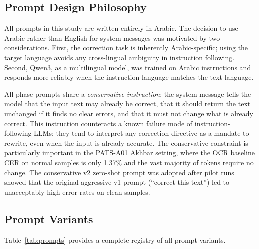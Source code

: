 \subsection{Prompt Design Philosophy}
\label{subsec:prompt_design}

All prompts in this study are written entirely in Arabic.
The decision to use Arabic rather than English for system messages was motivated
by two considerations.
First, the correction task is inherently Arabic-specific; using the target language
avoids any cross-lingual ambiguity in instruction following.
Second, Qwen3, as a multilingual model, was trained on Arabic instructions and
responds more reliably when the instruction language matches the text language.

All phase prompts share a \emph{conservative instruction}: the system message
tells the model that the input text may already be correct, that it should return
the text unchanged if it finds no clear errors, and that it must not change what
is already correct.
This instruction counteracts a known failure mode of instruction-following LLMs:
they tend to interpret any correction directive as a mandate to rewrite, even when
the input is already accurate.
The conservative constraint is particularly important in the PATS-A01 Akhbar
setting, where the OCR baseline CER on normal samples is only 1.37\% and the
vast majority of tokens require no change.
The conservative v2 zero-shot prompt was adopted after pilot runs showed that the
original aggressive v1 prompt (``correct this text'') led to unacceptably high
error rates on clean samples.

\subsection{Prompt Variants}
\label{subsec:prompt_variants}

Table~\ref{tab:prompts} provides a complete registry of all prompt variants.

